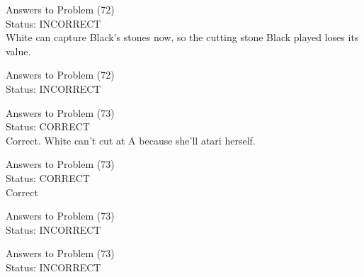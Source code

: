 \documentclass[11pt]{article}
\begin{document}
\begin{minipage}[t]{0.5\textwidth}
  {\centering
  
  Answers to Problem (72)\\
  Status: INCORRECT\\
  White can capture Black's stones now, so the cutting stone Black played loses its value.\\
  }
\end{minipage}
\begin{minipage}[t]{0.5\textwidth}
  {\centering
  
  Answers to Problem (72)\\
  Status: INCORRECT\\
  
  }
\end{minipage}
\begin{minipage}[t]{0.5\textwidth}
  {\centering
  
  Answers to Problem (73)\\
  Status: CORRECT\\
  Correct. White can't cut at A because she'll atari herself.\\
  }
\end{minipage}
\begin{minipage}[t]{0.5\textwidth}
  {\centering
  
  Answers to Problem (73)\\
  Status: CORRECT\\
  Correct\\
  }
\end{minipage}
\begin{minipage}[t]{0.5\textwidth}
  {\centering
  
  Answers to Problem (73)\\
  Status: INCORRECT\\
  
  }
\end{minipage}
\begin{minipage}[t]{0.5\textwidth}
  {\centering
  
  Answers to Problem (73)\\
  Status: INCORRECT\\
  
  }
\end{minipage}
\end{document}
